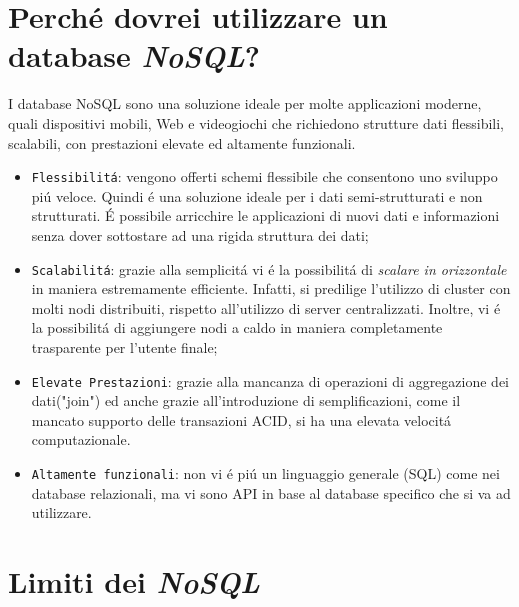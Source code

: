 \section{Perché dovrei utilizzare un database \emph{NoSQL}?}
I database NoSQL sono una soluzione ideale per molte applicazioni moderne, quali dispositivi mobili, Web e videogiochi
che richiedono strutture dati flessibili, scalabili, con prestazioni elevate ed altamente funzionali.
\begin{itemize}
    \item \texttt{Flessibilitá}: vengono offerti schemi flessibile che consentono uno sviluppo piú veloce. Quindi é una soluzione ideale
    per i dati semi-strutturati e non strutturati. É possibile arricchire le applicazioni di nuovi dati e informazioni
    senza dover sottostare ad una rigida struttura dei dati;
    \item \texttt{Scalabilitá}: grazie alla semplicitá vi é la possibilitá di \emph{scalare in orizzontale} in maniera estremamente
    efficiente. Infatti, si predilige l'utilizzo di cluster con molti nodi distribuiti, rispetto all'utilizzo di server centralizzati.
    Inoltre, vi é la possibilitá di aggiungere nodi a caldo in maniera completamente trasparente per l'utente finale;
    \item \texttt{Elevate Prestazioni}: grazie alla mancanza di operazioni di aggregazione dei dati("join") ed anche grazie
    all'introduzione di semplificazioni, come il mancato supporto delle transazioni ACID, si ha una elevata velocitá computazionale.
    \item \texttt{Altamente funzionali}: non vi é piú un linguaggio generale (SQL) come nei database relazionali, ma vi sono
    API in base al database specifico che si va ad utilizzare.
\end{itemize}

\section{Limiti dei \emph{NoSQL}}

